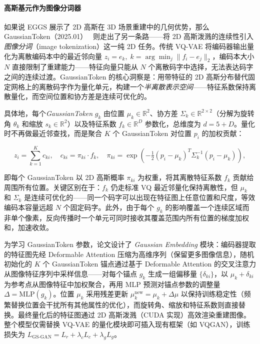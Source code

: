 \paragraph{高斯基元作为图像分词器}

如果说 EGGS 展示了 2D 高斯在 3D 场景重建中的几何优势，那么 GaussianToken（2025.01）~\cite{2501_15619} 则走出了另一条路——将 2D 高斯泼溅的连续性引入\emph{图像分词}（image tokenization）这一纯 2D 任务。传统 VQ-VAE 将编码器输出量化为离散编码本中的最近邻向量 $z_i = e_k,\; k = \arg\min_j \|f_i - e_j\|_2$，编码本大小 $N$ 直接限制了重建能力——特征向量只能从 $N$ 个离散码字中选择，无法表达码字之间的连续过渡。GaussianToken 的核心洞察是：用带特征的 2D 高斯分布替代固定网格上的离散码字作为量化单元，构建一个\emph{半离散表示空间}——特征系数保持离散量化，而空间位置和协方差是连续可优化的。

具体地，每个\emph{GaussianToken} $g_k$ 由位置 $\mu_k \in \mathbb{R}^2$、协方差 $\Sigma_k \in \mathbb{R}^{2\times 2}$（分解为旋转角 $\theta_k$ 和缩放 $s_k \in \mathbb{R}^2$）以及特征系数 $f_k \in \mathbb{R}^D$ 参数化，总维度为 $d = 5 + D$。量化时不再做最近邻查找，而是聚合 $K$ 个 GaussianToken 对位置 $p_i$ 的加权贡献：

\begin{equation}
z_i = \sum_{k=1}^{K} c_{ki}, \quad c_{ki} = \pi_{ki} \cdot f_k, \quad \pi_{ki} = \exp\!\left(-\tfrac{1}{2}(p_i-\mu_k)^T\Sigma_k^{-1}(p_i-\mu_k)\right),
\end{equation}

即每个 GaussianToken 以 2D 高斯概率 $\pi_{ki}$ 为权重，将其离散特征系数 $f_k$ 贡献给周围所有位置。关键区别在于：$f_k$ 仍走标准 VQ 最近邻量化保持离散性，但 $\mu_k$ 和 $\Sigma_k$ 是连续可优化的——同一个码字可以出现在特征图上任意位置和尺度，等效编码本容量远超 $N$ 个固定码字。此外，由于每个 $g_k$ 的影响覆盖一个连续区域而非单个像素，反向传播时一个单元可同时接收其覆盖范围内所有位置的梯度加权和，加速收敛。

为学习 GaussianToken 参数，论文设计了 \emph{Gaussian Embedding} 模块：编码器提取的特征图先经 Deformable Attention 压缩为高维序列（保留更多图像信息），随机初始化的 $K$ 个 GaussianToken 锚点通过基于 Deformable Attention 的交叉注意力从图像特征序列中采样信息——对每个锚点 $g_k$ 生成一组偏移量 $\{\delta_{ki}\}$，以 $\mu_k + \delta_{ki}$ 为参考点从图像特征中加权聚合，再用 MLP 预测对锚点参数的调整量 $\Delta = \text{MLP}(g_k)$。位置 $\mu_k$ 采用残差更新 $\mu_k^{\text{new}} = \mu_k + \Delta\mu$ 以保持训练稳定性（频繁替换位置会干扰所有其他属性的优化），而旋转角、缩放和特征系数则直接替换。最终量化后的特征图通过 2D 高斯泼溅（CUDA 实现）高效渲染重建图像。整个模型仅需替换 VQ-VAE 的量化模块即可插入现有框架（如 VQGAN），训练损失为 $L_\text{GS-GAN} = L_r + \lambda_c L_c + \lambda_g L_g$。


